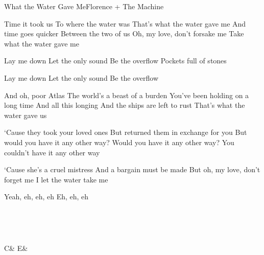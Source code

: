 \documentclass[a4paper,11pt,french]{article}
\begin{document}

\begin{Song}{What the Water Gave Me}{Florence + The Machine}
\begin{multicols}{2}
\begin{Verse}
Time it took us
To where the water was
That’s what the water gave me
And time goes quicker
Between the two of us
Oh, my love, don’t forsake me
Take what the water gave me
\end{Verse}
\espaceInterStrophe

\begin{Chorus}
Lay me down
Let the only sound
Be the overflow
Pockets full of stones
\espaceInterStrophe

Lay me down
Let the only sound
Be the overflow
\end{Chorus}
\espaceInterStrophe

\begin{Verse}
And oh, poor Atlas
The world’s a beast of a burden
You’ve been holding on a long time
And all this longing
And the ships are left to rust
That’s what the water gave us
\end{Verse}
\columnbreak

\tochorus
\espaceInterStrophe

\begin{Bridge}
‘Cause they took your loved ones
But returned them in exchange for you
But would you have it any other way?
Would you have it any other way?
You couldn't have it any other way
\espaceInterStrophe

‘Cause she’s a cruel mistress
And a bargain must be made
But oh, my love, don’t forget me
I let the water take me
\end{Bridge}
\espaceInterStrophe

\tochorus[Calm]
\espaceInterStrophe

\tochorus
\espaceInterStrophe

\begin{Chorus}
Yeah, eh, eh, eh
Eh, eh, eh
\adlib
\end{Chorus}
\vfill
~
\end{multicols}

\vfill

\begin{multicols}{2}

\gridGroupNormal\\

\begin{Chords}
\hline
C\mineur & E\bemol & \\\hline
\end{Chords}
\espaceInterGrille


\end{multicols}
\end{Song}
\end{document}
